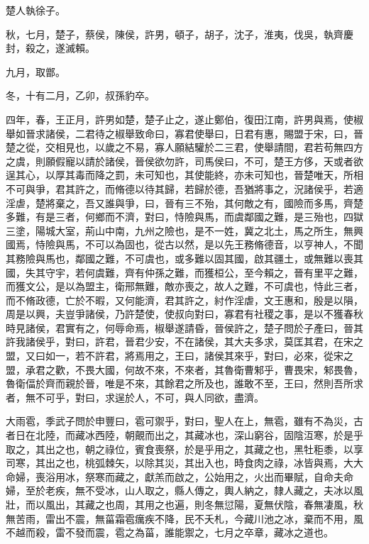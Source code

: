 \begin{pinyinscope}
楚人執徐子。

秋，七月，楚子，蔡侯，陳侯，許男，頓子，胡子，沈子，淮夷，伐吳，執齊慶封，殺之，遂滅賴。

九月，取鄫。

冬，十有二月，乙卯，叔孫豹卒。

四年，春，王正月，許男如楚，楚子止之，遂止鄭伯，復田江南，許男與焉，使椒舉如晉求諸侯，二君待之椒舉致命曰，寡君使舉曰，日君有惠，賜盟于宋，曰，晉楚之從，交相見也，以歲之不易，寡人願結驩於二三君，使舉請間，君若苟無四方之虞，則願假寵以請於諸侯，晉侯欲勿許，司馬侯曰，不可，楚王方侈，天或者欲逞其心，以厚其毒而降之罰，未可知也，其使能終，亦未可知也，晉楚唯天，所相不可與爭，君其許之，而脩德以待其歸，若歸於德，吾猶將事之，況諸侯乎，若適淫虐，楚將棄之，吾又誰與爭，曰，晉有三不殆，其何敵之有，國險而多馬，齊楚多難，有是三者，何鄉而不濟，對曰，恃險與馬，而虞鄰國之難，是三殆也，四獄三塗，陽城大室，荊山中南，九州之險也，是不一姓，冀之北土，馬之所生，無興國焉，恃險與馬，不可以為固也，從古以然，是以先王務脩德音，以亨神人，不聞其務險與馬也，鄰國之難，不可虞也，或多難以固其國，啟其疆土，或無難以喪其國，失其守宇，若何虞難，齊有仲孫之難，而獲桓公，至今賴之，晉有里平之難，而獲文公，是以為盟主，衛邢無難，敵亦喪之，故人之難，不可虞也，恃此三者，而不脩政德，亡於不暇，又何能濟，君其許之，紂作淫虐，文王惠和，殷是以隕，周是以興，夫豈爭諸侯，乃許楚使，使叔向對曰，寡君有社稷之事，是以不獲春秋時見諸侯，君實有之，何辱命焉，椒舉遂請昏，晉侯許之，楚子問於子產曰，晉其許我諸侯乎，對曰，許君，晉君少安，不在諸侯，其大夫多求，莫匡其君，在宋之盟，又曰如一，若不許君，將焉用之，王曰，諸侯其來乎，對曰，必來，從宋之盟，承君之歡，不畏大國，何故不來，不來者，其魯衛曹邾乎，曹畏宋，邾畏魯，魯衛偪於齊而親於晉，唯是不來，其餘君之所及也，誰敢不至，王曰，然則吾所求者，無不可乎，對曰，求逞於人，不可，與人同欲，盡濟。

大雨雹，季武子問於申豐曰，雹可禦乎，對曰，聖人在上，無雹，雖有不為災，古者日在北陸，而藏冰西陸，朝覿而出之，其藏冰也，深山窮谷，固陰沍寒，於是乎取之，其出之也，朝之祿位，賓食喪祭，於是乎用之，其藏之也，黑牡秬黍，以享司寒，其出之也，桃弧棘矢，以除其災，其出入也，時食肉之祿，冰皆與焉，大大命婦，喪浴用冰，祭寒而藏之，獻羔而啟之，公始用之，火出而畢賦，自命夫命婦，至於老疾，無不受冰，山人取之，縣人傳之，輿人納之，隸人藏之，夫冰以風壯，而以風出，其藏之也周，其用之也遍，則冬無愆陽，夏無伏陰，春無凄風，秋無苦雨，雷出不震，無菑霜雹癘疾不降，民不夭札，今藏川池之冰，棄而不用，風不越而殺，雷不發而震，雹之為菑，誰能禦之，七月之卒章，藏冰之道也。


\end{pinyinscope}
